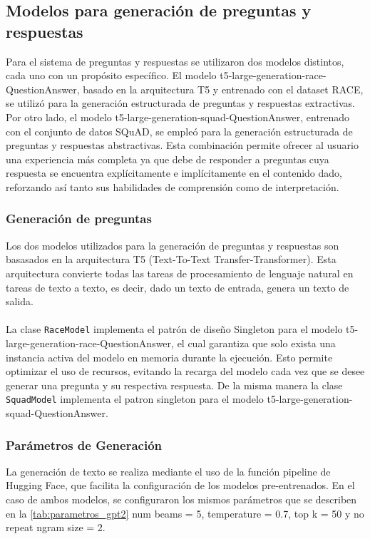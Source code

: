 \subsection{Modelos para generación de preguntas y respuestas}

Para el sistema de preguntas y respuestas se utilizaron dos modelos distintos, cada uno con un propósito específico. El modelo t5-large-generation-race-QuestionAnswer, basado en la arquitectura T5 y entrenado con el dataset RACE, se utilizó para la generación estructurada de preguntas y respuestas extractivas. Por otro lado, el modelo t5-large-generation-squad-QuestionAnswer, entrenado con el conjunto de datos SQuAD, se empleó para la generación estructurada de preguntas y respuestas abstractivas. Esta combinación permite ofrecer al usuario una experiencia más completa ya que debe de responder a preguntas cuya respuesta se encuentra explícitamente e implícitamente en el contenido dado, reforzando así tanto sus habilidades de comprensión como de interpretación.

\newpage
\subsubsection{Generaci\'on de preguntas}

Los dos modelos utilizados para la generaci\'on de preguntas y respuestas son basasados en la arquitectura T5 (Text-To-Text Transfer-Transformer). Esta arquitectura convierte todas las tareas de procesamiento de lenguaje natural en tareas de texto a texto, es decir, dado un texto de entrada, genera un texto de salida.
\\
\\
La clase \texttt{RaceModel} implementa el patr\'on de dise\~no Singleton para el modelo t5-large-generation-race-QuestionAnswer, el cual garantiza que solo exista una instancia activa del modelo en memoria durante la ejecuci\'on. Esto permite optimizar el uso de recursos, evitando la recarga del modelo cada vez que se desee generar una pregunta y su respectiva respuesta. De la misma manera la clase \texttt{SquadModel} implementa el patron singleton para el modelo t5-large-generation-squad-QuestionAnswer.

\subsubsection{Parámetros de Generación}

La generación de texto se realiza mediante el uso de la función pipeline de Hugging Face, que facilita la configuración de los modelos pre-entrenados. En el caso de ambos modelos, se configuraron los mismos parámetros que se describen en la \autoref {tab:parametros_gpt2} num beams = 5, temperature = 0.7, top k = 50 y no repeat ngram size = 2.

